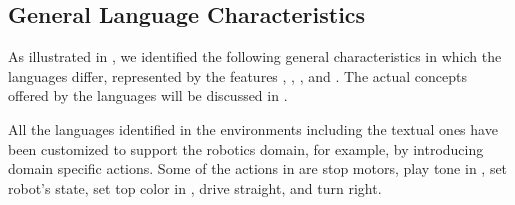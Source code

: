 \subsection{General Language Characteristics}\label{sec:langcharacteristics}
As illustrated in , we identified the following general characteristics in which the languages differ, represented by the features \fnotation, \fsemantics, \flangparadigm, and \fextensibility. The actual concepts offered by the languages will be discussed in .


All the languages identified in the environments including the textual ones have been customized to support the robotics domain, for example, by introducing domain specific actions. Some of the actions in \lego are stop motors, play tone in \trik, set robot's state, set top color in \aseba,  drive straight, and turn right. %

